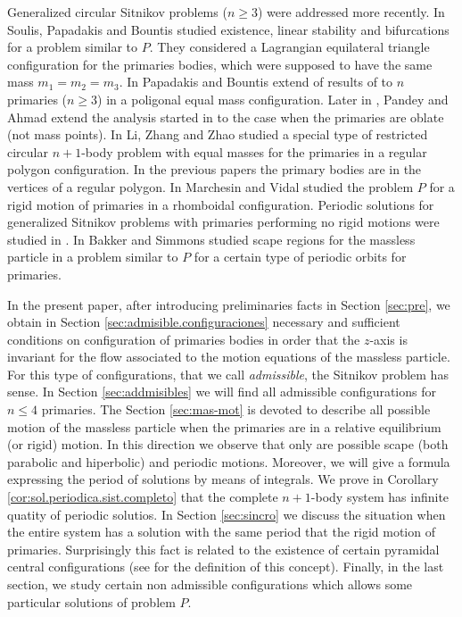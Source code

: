 \documentclass[twoside]{article}
\theoremstyle{remark}
\begin{document}
Generalized circular Sitnikov problems ($n\geq 3$)   were addressed more recently.
In \cite{soulis2008periodic} Soulis, Papadakis and Bountis studied existence, linear stability and bifurcations for a problem similar to $P$. They considered  a Lagrangian equilateral triangle configuration for the primaries bodies, which were supposed to have the same mass $m_1=m_2=m_3$. In \cite{bountis2009stability} Papadakis and Bountis extend of results of \cite{soulis2008periodic} to $n$ primaries ($n\geq 3$) in a poligonal equal mass configuration. Later  in \cite{pandey2013periodic}, Pandey and Ahmad extend the analysis started in \cite{soulis2008periodic} to the case when the primaries are oblate (not mass points).
In \cite{li2013characterization} Li, Zhang and Zhao studied a special type of
restricted circular $n+1$-body problem  with equal masses for the primaries in a regular polygon configuration. In the previous papers the primary bodies are in the vertices of a regular polygon. In \cite{marchesin2013spatial} Marchesin and Vidal studied the problem $P$ for a rigid motion  of primaries in a  rhomboidal configuration.
Periodic solutions for generalized Sitnikov problems with primaries performing  no rigid motions were studied in \cite{rivera2013periodic, pustyl1990certain}. In \cite{bakker2015separating} Bakker and Simmons studied scape regions for the massless particle in a problem similar to $P$ for a certain type of periodic orbits for primaries.


In the present paper, after introducing preliminaries facts in Section \ref{sec:pre},   we
obtain in Section \ref{sec:admisible.configuraciones} necessary and sufficient conditions on  configuration of primaries bodies in order  that the $z$-axis is invariant for the flow associated to the motion equations of the massless particle. For this type of configurations, that we call \emph{admissible}, the Sitnikov problem has sense.  In Section \ref{sec:addmisibles} we will find all admissible configurations for $n\leq 4$ primaries.  The Section \ref{sec:mas-mot} is devoted to describe all possible motion of the massless particle when the primaries are in a relative equilibrium (or rigid) motion. In this direction we observe that only are possible scape (both parabolic and hiperbolic) and periodic motions. Moreover, we will give a formula expressing the period of solutions  by means of integrals.  We prove in Corollary \ref{cor:sol.periodica.sist.completo} that the complete $n+1$-body system has  infinite quatity of periodic solutios. In Section  \ref{sec:sincro} we discuss the situation when the entire system has a solution with the same period that the rigid motion of primaries. Surprisingly this fact is related to the existence of certain pyramidal central configurations (see \cite{fayccal1996classification,faycaltesis,ouyang2004pyramidal} for the definition of this concept). Finally, in the last section, we study certain non admissible configurations which allows some particular solutions of problem $P$.
\end{document}
